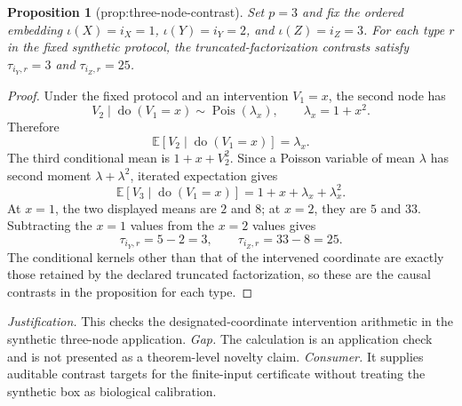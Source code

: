 \documentclass{article}
\newtheorem{proposition}{Proposition}
\begin{document}
\begin{proposition}[prop:three-node-contrast]\label{prop:three-node-contrast}
Set \(p=3\) and fix the ordered embedding \(\iota(X)=i_X=1\), \(\iota(Y)=i_Y=2\), and \(\iota(Z)=i_Z=3\). For each type \(r\) in the fixed synthetic protocol, the truncated-factorization contrasts satisfy \(\tau_{i_Y,r}=3\) and \(\tau_{i_Z,r}=25\).
\end{proposition}
\begin{proof}
Under the fixed protocol and an intervention \(V_1=x\), the second node has
\[
V_2\mid\operatorname{do}(V_1=x)\sim
\operatorname{Pois}(\lambda_x),\qquad \lambda_x=1+x^2.
\]
Therefore
\[
\mathbb E[V_2\mid\operatorname{do}(V_1=x)]=\lambda_x.
\]
The third conditional mean is \(1+x+V_2^2\).  Since a Poisson variable of mean \(\lambda\) has second moment \(\lambda+\lambda^2\), iterated expectation gives
\[
\mathbb E[V_3\mid\operatorname{do}(V_1=x)]
=1+x+\lambda_x+\lambda_x^2. \tag{14}
\]
At \(x=1\), the two displayed means are \(2\) and \(8\); at \(x=2\), they are \(5\) and \(33\).  Subtracting the \(x=1\) values from the \(x=2\) values gives
\[
\tau_{i_Y,r}=5-2=3,\qquad
\tau_{i_Z,r}=33-8=25.
\]
The conditional kernels other than that of the intervened coordinate are exactly those retained by the declared truncated factorization, so these are the causal contrasts in the proposition for each type.
\end{proof}
\par\smallskip\noindent \textit{Justification.} This checks the designated-coordinate intervention arithmetic in the synthetic three-node application. \textit{Gap.} The calculation is an application check and is not presented as a theorem-level novelty claim. \textit{Consumer.} It supplies auditable contrast targets for the finite-input certificate without treating the synthetic box as biological calibration.
\end{document}
